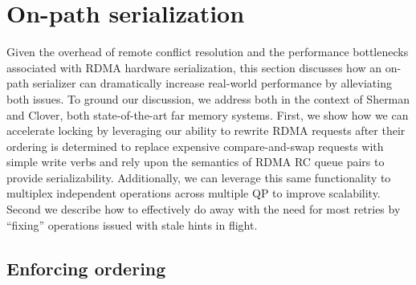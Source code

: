 \section{On-path serialization}

Given the overhead of remote conflict resolution and the performance bottlenecks
associated with RDMA hardware serialization, this section discusses how an
on-path serializer can dramatically increase real-world performance by
alleviating both issues. To ground our discussion, we address both in the
context of Sherman and Clover, both state-of-the-art far memory systems.  First,
we show how we can accelerate locking by leveraging our ability to rewrite RDMA
requests after their ordering is determined to replace expensive
compare-and-swap requests with simple write verbs and rely upon the semantics of
RDMA RC queue pairs to provide serializability.  Additionally, we can leverage
this same functionality to multiplex independent operations across multiple QP
to improve scalability.  Second we describe how to effectively do away with the
need for most retries by ``fixing'' operations issued with stale hints in
flight.  



\subsection{Enforcing ordering}

